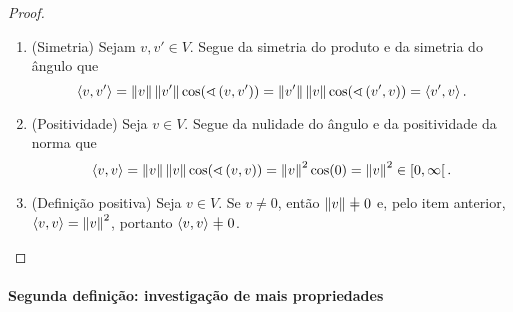 \begin{proof}
\begin{enumerate}
		\item (Simetria) Sejam $v,v' \in V$. Segue da simetria do produto e da simetria do ângulo que
			\begin{equation*}
				\left\langle{v},{v'}\right\rangle = \left\Vert{v}\right\Vert\left\Vert{v'}\right\Vert\cos(\sphericalangle\left({v},{v'}\right)) = \left\Vert{v'}\right\Vert\left\Vert{v}\right\Vert\cos(\sphericalangle\left({v'},{v}\right)) = \left\langle{v'},{v}\right\rangle.
			\end{equation*}

		\item (Positividade) Seja $v \in V$. Segue da nulidade do ângulo e da positividade da norma que
			\begin{equation*}
				\left\langle{v},{v}\right\rangle = \left\Vert{v}\right\Vert\left\Vert{v}\right\Vert\cos(\sphericalangle\left({v},{v}\right)) = \left\Vert{v}\right\Vert^2\cos(0) = \left\Vert{v}\right\Vert^2 \in \left[{0},{\infty}\right[.
			\end{equation*}

		\item (Definição positiva) Seja $v \in V$. Se $v \neq 0$, então $\nor{v} \neq 0$ e, pelo item anterior, $\left\langle{v},{v}\right\rangle = \left\Vert{v}\right\Vert^2$, portanto $\inte{v}{v} \neq 0$.

	\end{enumerate}
\end{proof}




\paragraph{Segunda definição: investigação de mais propriedades}

